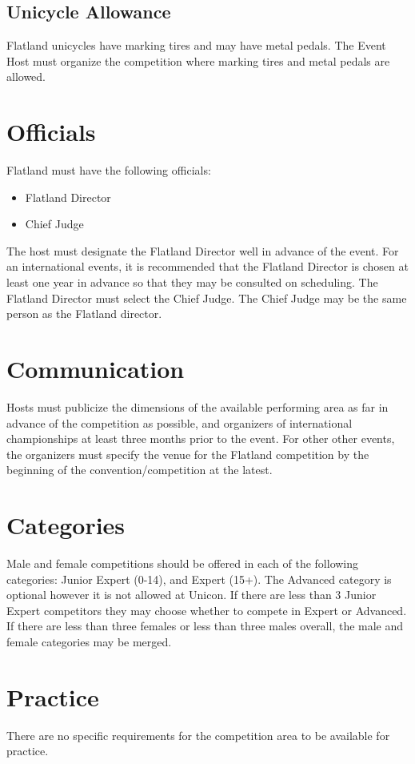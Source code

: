\subsection{Unicycle Allowance}
Flatland unicycles have marking tires and may have metal pedals.
The Event Host must organize the competition where marking tires and metal pedals are allowed.

\section{Officials}

Flatland must have the following officials:
\begin{itemize}
\item Flatland Director
\item Chief Judge
\end{itemize}

The host must designate the Flatland Director well in advance of the event.
For an international events, it is recommended that the Flatland Director is chosen at least one year in advance so that they may be consulted on scheduling.
The Flatland Director must select the Chief Judge.
The Chief Judge may be the same person as the Flatland director.

\section{Communication}

Hosts must publicize the dimensions of the available performing area as far in advance of the competition as possible, and organizers of international championships at least three months prior to the event.
For other other events, the organizers must specify the venue for the Flatland competition by the beginning of the convention/competition at the latest.

\section{Categories}
Male and female competitions should be offered in each of the following categories: Junior Expert (0-14), and Expert (15+).
The Advanced category is optional however it is not allowed at Unicon.
If there are less than 3 Junior Expert competitors they may choose whether to compete in Expert or Advanced.
If there are less than three females or less than three males overall, the male and female categories may be merged.

\section{Practice}

There are no specific requirements for the competition area to be available for practice.
